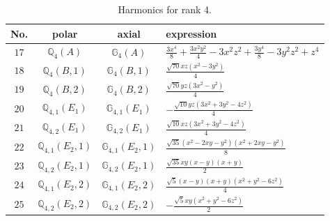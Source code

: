 \documentclass[fleqn,8pt,landscape]{jsarticle}
\begin{document}
\begin{table}[ht!]
\begin{center}
\caption{Harmonics for rank 4.}
\renewcommand{\arraystretch}{1.3}
\begin{tabular}{cccl} \hline \hline
No. & polar & axial & expression \\ \hline
$ 17 $ & $ \mathbb{Q}_{4}(A) $ & $ \mathbb{G}_{4}(A) $ & $ \frac{3 x^{4}}{8} + \frac{3 x^{2} y^{2}}{4} - 3 x^{2} z^{2} + \frac{3 y^{4}}{8} - 3 y^{2} z^{2} + z^{4} $ \\
$ 18 $ & $ \mathbb{Q}_{4}(B,1) $ & $ \mathbb{G}_{4}(B,1) $ & $ \frac{\sqrt{70} x z \left(x^{2} - 3 y^{2}\right)}{4} $ \\
$ 19 $ & $ \mathbb{Q}_{4}(B,2) $ & $ \mathbb{G}_{4}(B,2) $ & $ \frac{\sqrt{70} y z \left(3 x^{2} - y^{2}\right)}{4} $ \\
$ 20 $ & $ \mathbb{Q}_{4,1}(E_{1}) $ & $ \mathbb{G}_{4,1}(E_{1}) $ & $ - \frac{\sqrt{10} y z \left(3 x^{2} + 3 y^{2} - 4 z^{2}\right)}{4} $ \\
$ 21 $ & $ \mathbb{Q}_{4,2}(E_{1}) $ & $ \mathbb{G}_{4,2}(E_{1}) $ & $ \frac{\sqrt{10} x z \left(3 x^{2} + 3 y^{2} - 4 z^{2}\right)}{4} $ \\
$ 22 $ & $ \mathbb{Q}_{4,1}(E_{2},1) $ & $ \mathbb{G}_{4,1}(E_{2},1) $ & $ \frac{\sqrt{35} \left(x^{2} - 2 x y - y^{2}\right) \left(x^{2} + 2 x y - y^{2}\right)}{8} $ \\
$ 23 $ & $ \mathbb{Q}_{4,2}(E_{2},1) $ & $ \mathbb{G}_{4,2}(E_{2},1) $ & $ \frac{\sqrt{35} x y \left(x - y\right) \left(x + y\right)}{2} $ \\
$ 24 $ & $ \mathbb{Q}_{4,1}(E_{2},2) $ & $ \mathbb{G}_{4,1}(E_{2},2) $ & $ \frac{\sqrt{5} \left(x - y\right) \left(x + y\right) \left(x^{2} + y^{2} - 6 z^{2}\right)}{4} $ \\
$ 25 $ & $ \mathbb{Q}_{4,2}(E_{2},2) $ & $ \mathbb{G}_{4,2}(E_{2},2) $ & $ - \frac{\sqrt{5} x y \left(x^{2} + y^{2} - 6 z^{2}\right)}{2} $ \\
 \hline \hline
\end{tabular}
\end{center}
\end{table}
\end{document}
